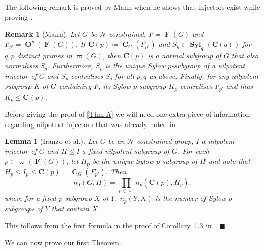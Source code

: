 \documentclass[a4paper,12pt,reqno]{amsart}
\newtheorem{lemma}[theorem]{Lemma}
\newtheorem{remark}[theorem]{Remark}
\numberwithin{equation}{section}
\DeclareMathOperator{\fitt}{\mathbf{F}}
\DeclareMathOperator{\cent}{\mathbf{C}}
\DeclareMathOperator{\oh}{\mathbf{O}}
\DeclareMathOperator{\syl}{\mathbf{Syl}}
\renewcommand{\leq}{\leqslant}
\newenvironment{proofof}{{\bf {Proof.} }}{\hfill $\blacksquare$ \\}
\def\C_p{{\mathbf{C}(p)}}
\begin{document}
 
 The following remark is proved by Mann when he shows that injectors exist while proving \cite[Theorem 1]{mann_injectors}.

\begin{remark}[Mann]
\label{Rem:Mann}
Let $G$ be $\mathcal{N}$-constrained,  $F = \fitt(G)$ and  $F_{p'} = \oh^p(\fitt(G))$. If  $\C_p \coloneqq \cent_G(F_{p'})$ and $S_q \in \syl_q(\mathbf{C}(q))$ for $q , p $ distinct primes in $\varpi (G)$, then $\C_p$ is a normal subgroup of $G$ that also   normalises  $S_q$.
Furthermore,   $S_p$ is  the unique Sylow $p$-subgroup
of a nilpotent injector of $G$ and $S_p$ centralises $S_q$ for all  $p,q$ as above.  Finally,  for any  nilpotent subgroup $K$ of $G$ containing $F$, its
 Sylow $p$-subgroup $K_p$ 
centralises $F_{p'}$ and thus $K_p \leq \C_p$.     
\end{remark}

Before giving the proof of \autoref{Thm:A} we will need one extra piece of information regarding nilpotent  injectors that was already noted in \cite{arithmetical_questions}.

\begin{lemma}[Iranzo et al.]
\label{Lem:Product}
Let $G$ be an $\mathcal{N}$-constrained group, $I$ a nilpotent injector of $G$ and  $H \leq I$ a fixed nilpotent subgroup of $G$. 
For each $p \in \varpi(\fitt(G))$, 
let $H_p$ be the unique Sylow $p$-subgroup of $H$
and note that $H_p \leq I_p \leq \C_p = \cent_G(F_{p'})$.
Then
\[
n_\mathfrak{I}(G, H) = \prod_{p \in \varpi} n_p(\C_p, H_p),
\]
where 
for a fixed $p$-subgroup $X$ of $Y$, 
$n_p(Y, X)$ is the number of Sylow $p$-subgroups of $Y$ that contain $X$.
\end{lemma}
\begin{proofof}
This follows from the first formula in the proof of Corollary~1.3 in~\cite{arithmetical_questions}.  
\end{proofof}

We can now prove our first Theorem.
\end{document}
